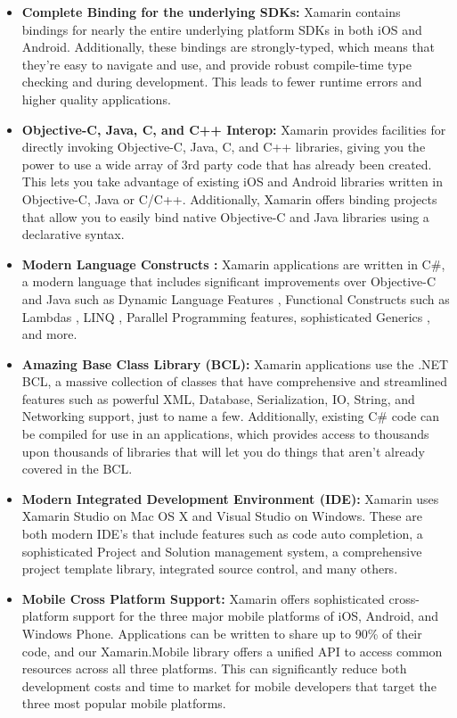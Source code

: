  \begin{itemize}


   \item \textbf{ Complete Binding for the underlying SDKs:}   Xamarin contains bindings for nearly the entire underlying platform SDKs in both iOS and Android. Additionally, these bindings are strongly-typed, which means that they’re easy to navigate and use, and provide robust compile-time type checking and during development. This leads to fewer runtime errors and higher quality applications.

   \item \textbf{Objective-C, Java, C, and C++ Interop:}  Xamarin provides facilities for directly invoking Objective-C, Java, C, and C++ libraries, giving you the power to use a wide array of 3rd party code that has already been created. This lets you take advantage of existing iOS and Android libraries written in Objective-C, Java or C/C++. Additionally, Xamarin offers binding projects that allow you to easily bind native Objective-C and Java libraries using a declarative syntax.

   \item \textbf{Modern Language Constructs :}     Xamarin applications are written in C\#, a modern language that includes significant improvements over Objective-C and Java such as Dynamic Language Features , Functional Constructs such as Lambdas , LINQ , Parallel Programming features, sophisticated Generics , and more.

   \item \textbf{Amazing Base Class Library (BCL): }  Xamarin applications use the .NET BCL, a massive collection of classes that have comprehensive and streamlined features such as powerful XML, Database, Serialization, IO, String, and Networking support, just to name a few. Additionally, existing C\# code can be compiled for use in an applications, which provides access to thousands upon thousands of libraries that will let you do things that aren’t already covered in the BCL.

   \item \textbf{Modern Integrated Development Environment (IDE):}  Xamarin uses Xamarin Studio on Mac OS X and Visual Studio on Windows. These are both modern IDE’s that include features such as code auto completion, a sophisticated Project and Solution management system, a comprehensive project template library, integrated source control, and many others.

   \item \textbf{Mobile Cross Platform Support:}   Xamarin offers sophisticated cross-platform support for the three major mobile platforms of iOS, Android, and Windows Phone. Applications can be written to share up to 90\% of their code, and our Xamarin.Mobile library offers a unified API to access common resources across all three platforms. This can significantly reduce both development costs and time to market for mobile developers that target the three most popular mobile platforms.

 \end{itemize}


